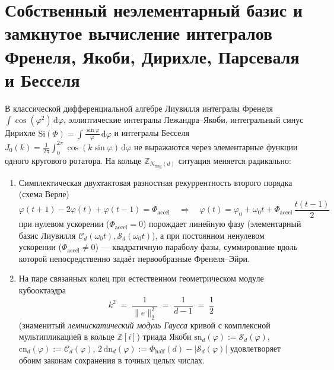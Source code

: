 \documentclass[11pt,a4paper]{article}
\theoremstyle{plain}
\theoremstyle{definition}
\begin{document}
\section{Собственный неэлементарный базис и замкнутое вычисление интегралов Френеля, Якоби, Дирихле, Парсеваля и Бесселя}
\label{sec:integrals}

В классической дифференциальной алгебре Лиувилля интегралы Френеля $\int\cos(\varphi^2)\,\mathrm{d}\varphi$, эллиптические интегралы Лежандра--Якоби, интегральный синус Дирихле $\mathrm{Si}(\Phi)=\int\frac{\sin\varphi}{\varphi}\,\mathrm{d}\varphi$ и интегралы Бесселя $J_0(k)=\frac{1}{2\pi}\int_0^{2\pi}\cos(k\sin\varphi)\,\mathrm{d}\varphi$ не выражаются через элементарные функции одного кругового ротатора. На кольце $\mathbb{Z}_{N_{\mathrm{ring}}(d)}$ ситуация меняется радикально:
\begin{enumerate}[leftmargin=*,noitemsep]
\item Симплектическая двухтактовая разностная рекуррентность второго порядка (схема Верле)
  \begin{equation}
    \label{eq:verlet-parabola}
    \varphi(t+1) - 2\varphi(t) + \varphi(t-1) = \Phi_{\mathrm{accel}}
    \quad\Longrightarrow\quad
    \varphi(t) = \varphi_0 + \omega_0 t + \Phi_{\mathrm{accel}}\,\frac{t(t-1)}{2}
  \end{equation}
  при нулевом ускорении ($\Phi_{\mathrm{accel}}=0$) порождает линейную фазу (элементарный базис Лиувилля $\mathcal{C}_d(\omega_0 t),\mathcal{S}_d(\omega_0 t)$), а при постоянном ненулевом ускорении ($\Phi_{\mathrm{accel}}\ne 0$) --- квадратичную параболу фазы, суммирование вдоль которой непосредственно задаёт первообразные Френеля--Эйри.
\item На паре связанных колец при естественном геометрическом модуле кубооктаэдра
  \[
    k^2 \;=\; \frac{1}{\|e\|_2^2} \;=\; \frac{1}{d-1} \;=\; \frac{1}{2}
  \]
  (знаменитый \emph{лемнискатический модуль Гаусса} кривой с комплексной мультипликацией в кольце $\mathbb{Z}[i]$) триада Якоби $\mathrm{sn}_d(\varphi):=\mathcal{S}_d(\varphi)$, $\mathrm{cn}_d(\varphi):=\mathcal{C}_d(\varphi)$, $2\,\mathrm{dn}_d(\varphi):=\Phi_{\mathrm{half}}(d)-|\mathcal{S}_d(\varphi)|$ удовлетворяет обоим законам сохранения в точных целых числах.
\end{enumerate}
\end{document}
